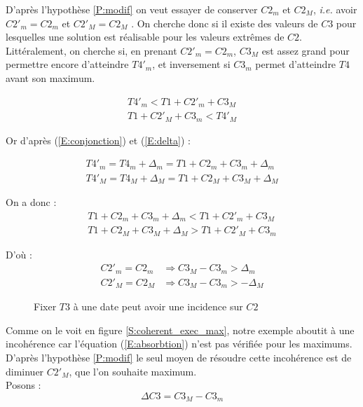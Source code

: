 \documentclass[10pt,a4paper]{article}
\newcommand{\hyporef}[1]{l'hypothèse \ref{#1}}
\newcommand*{\TikzPath}{../Algo/PropagationTIKZ}%
\begin{document}
D'après \hyporef{P:modif} on veut essayer de conserver $C2_m$ et $C2_M$, \textit{i.e.} avoir $C2'_m = C2_m$ et $C2'_M = C2_M$ . On cherche donc si il existe des valeurs de $C3$ pour lesquelles une solution est réalisable pour les valeurs extrêmes de $C2$. Littéralement, on cherche si, en prenant $C2'_m = C2_m$, $C3_M$ est assez grand pour permettre encore d'atteindre $T4'_m$, et inversement si $C3_m$ permet d'atteindre $T4$ avant son maximum.

	\begin{eqnarray}
		T4'_m < T1 + C2'_m + C3_M \\
		T1 + C2'_M + C3_m < T4'_M \nonumber
	\end{eqnarray}

Or d'après (\ref{E:conjonction}) et (\ref{E:delta}) :

	\begin{eqnarray}
		T4'_m = T4_m + \Delta{}_m = T1 + C2_m + C3_m + \Delta{}_m \\
		T4'_M = T4_M + \Delta{}_M = T1 + C2_M + C3_M + \Delta{}_M \nonumber
	\end{eqnarray}

On a donc :
	\begin{eqnarray}
		\label{E:comparaison}
		T1 + C2_m + C3_m + \Delta{}_m < T1 + C2'_m + C3_M \\
		T1 + C2_M + C3_M + \Delta{}_M > T1 + C2'_M + C3_m  \nonumber
	\end{eqnarray}

D'où :
	\begin{eqnarray}
		\label{E:absorbtion}
		C2'_m = C2_m &\Rightarrow C3_M - C3_m > \Delta{}_m \\
		C2'_M = C2_M &\Rightarrow C3_M - C3_m > -\Delta{}_M \nonumber
	\end{eqnarray}


	\begin{figure}[htp]
		\begin{center}
			\hspace{5pt}
	
		\caption{Fixer $T3$ à une date peut avoir une incidence sur $C2$}
		\end{center}
	\end{figure}

Comme on le voit en figure \ref{S:coherent_exec_max}, notre exemple aboutit à une incohérence car l'équation (\ref{E:absorbtion}) n'est pas vérifiée pour les maximums. D'après \hyporef{P:modif} le seul moyen de résoudre cette incohérence est de diminuer $C2'_M$, que l'on souhaite maximum. \\
Posons : $$\Delta{C3} = C3_M - C3_m$$
\end{document}
